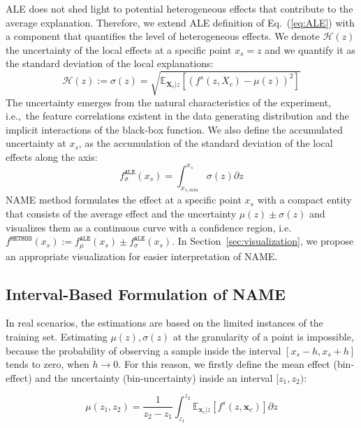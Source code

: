 \documentclass[twoside]{article}
\newcommand{\dfdx}{f^s}
\newcommand{\xc}{\mathbf{x}_c}
\newcommand{\Xcb}{\mathbf{X}_c}
\begin{document}
ALE does not shed light to potential heterogeneous effects that
contribute to the average explanation. Therefore, we extend ALE
definition of Eq.~(\ref{eq:ALE}) with a component that quantifies the
level of heterogeneous effects. We denote \(\mathcal{H}(z)\) the
uncertainty of the local effects at a specific point \(x_s=z\) and we
quantify it as the standard deviation of the local explanations:
\begin{equation}
  \label{eq:ALE_var}
  \mathcal{H}(z) := \sigma(z) = \sqrt{\mathbb{E}_{\Xcb|z}\left [ \left (\dfdx (z, X_c) - \mu(z) \right )^2 \right ] }
\end{equation}
\noindent
The uncertainty emerges from the natural characteristics of the
experiment, i.e.,~the feature correlations existent in the data
generating distribution and the implicit interactions of the black-box
function. We also define the accumulated uncertainty at \(x_s\), as
the accumulation of the standard deviation of the local effects along
the axis:
\begin{equation}
  \label{eq:ALE_acc_unc}
  f^{\mathtt{ALE}}_{\sigma}(x_s) = \int_{x_{s, min}}^{x_s} \sigma(z) \partial z
\end{equation}
\noindent
NAME method formulates the effect at a specific point \(x_s\) with a
compact entity that consists of the average effect and the uncertainty
\(\mu(z) \pm \sigma(z)\) and visualizes them as a continuous curve
with a confidence region, i.e.
\(f^{\mathtt{METHOD}}(x_s) := f^{\mathtt{ALE}}_{\mu}(x_s) \pm
f^{\mathtt{ALE}}_{\sigma}(x_s)\). In Section~\ref{sec:visualization},
we propose an appropriate visualization for easier interpretation of
NAME.

\subsection{Interval-Based Formulation of NAME}
\label{sec:interval-based-estimation}

In real scenarios, the estimations are based on the limited instances
of the training set. Estimating \(\mu(z), \sigma(z)\) at the
granularity of a point is impossible, because the probability of
observing a sample inside the interval \([x_s - h, x_s + h]\) tends to
zero, when \(h \to 0\). For this reason, we firstly define the mean
effect (bin-effect) and the uncertainty (bin-uncertainty) inside an interval \([z_1, z_2)\):

\begin{equation}
  \label{eq:mu_bin}
  \mu(z_1, z_2) = \frac{1}{z_2 - z_1} \int_{z_1}^{z_2}
  \mathbb{E}_{\xc|z}\left [f^s(z, \xc) \right ] \partial z
\end{equation}
\end{document}
